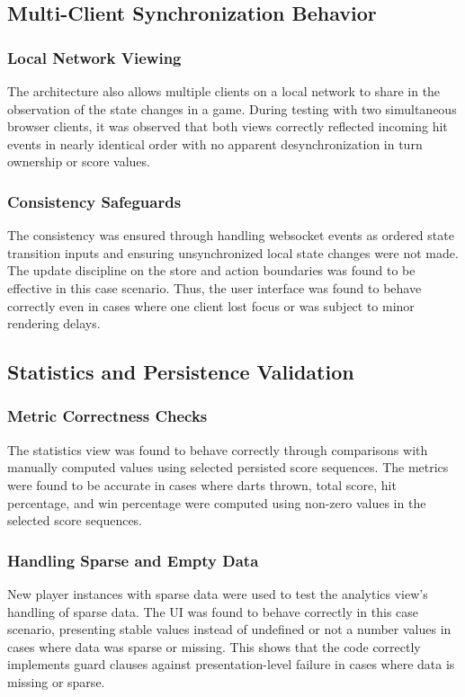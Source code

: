 \subsection{Multi-Client Synchronization Behavior}

\subsubsection{Local Network Viewing}
The architecture also allows multiple clients on a local network to share in the observation of the state changes in a game. During testing with two simultaneous browser clients, it was observed that both views correctly reflected incoming hit events in nearly identical order with no apparent desynchronization in turn ownership or score values.

\subsubsection{Consistency Safeguards}
The consistency was ensured through handling websocket events as ordered state transition inputs and ensuring unsynchronized local state changes were not made. The update discipline on the store and action boundaries was found to be effective in this case scenario. Thus, the user interface was found to behave correctly even in cases where one client lost focus or was subject to minor rendering delays.

\subsection{Statistics and Persistence Validation}

\subsubsection{Metric Correctness Checks}
The statistics view was found to behave correctly through comparisons with manually computed values using selected persisted score sequences. The metrics were found to be accurate in cases where darts thrown, total score, hit percentage, and win percentage were computed using non-zero values in the selected score sequences.

\subsubsection{Handling Sparse and Empty Data}
New player instances with sparse data were used to test the analytics view's handling of sparse data. The UI was found to behave correctly in this case scenario, presenting stable values instead of undefined or not a number values in cases where data was sparse or missing. This shows that the code correctly implements guard clauses against presentation-level failure in cases where data is missing or sparse.

